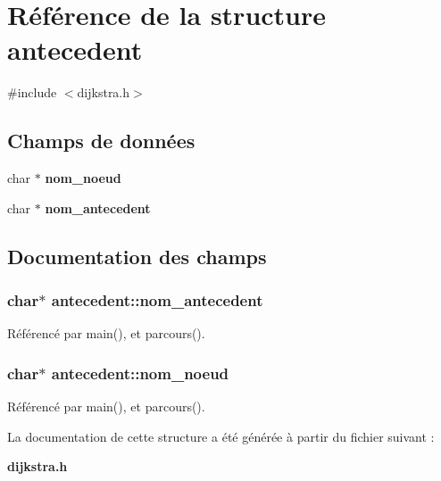 \section{Référence de la structure antecedent}
\label{structantecedent}


{\ttfamily \#include $<$dijkstra.\+h$>$}

\subsection*{Champs de données}
\begin{DoxyCompactItemize}
\item 
char $\ast$ {\bf nom\+\_\+noeud}
\item 
char $\ast$ {\bf nom\+\_\+antecedent}
\end{DoxyCompactItemize}


\subsection{Documentation des champs}
\subsubsection[{nom\+\_\+antecedent}]{\setlength{\rightskip}{0pt plus 5cm}char$\ast$ antecedent\+::nom\+\_\+antecedent}\label{structantecedent_ad92aa36236359f06408b0570cbb175f7}


Référencé par main(), et parcours().

\subsubsection[{nom\+\_\+noeud}]{\setlength{\rightskip}{0pt plus 5cm}char$\ast$ antecedent\+::nom\+\_\+noeud}\label{structantecedent_a252cd5b8b3a293c6f66270359012db0a}


Référencé par main(), et parcours().



La documentation de cette structure a été générée à partir du fichier suivant \+:\begin{DoxyCompactItemize}
\item 
{\bf dijkstra.\+h}\end{DoxyCompactItemize}
